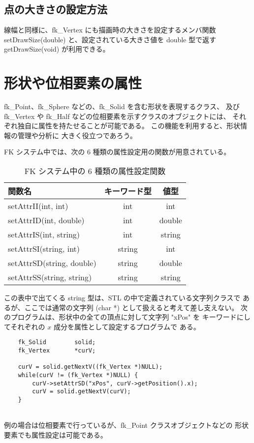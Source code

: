 \subsection{点の大きさの設定方法}
線幅と同様に、fk\_Vertex にも描画時の大きさを設定するメンバ関数
setDrawSize(double) と、設定されている大きさ値を double 型で返す
getDrawSize(void) が利用できる。

\section{形状や位相要素の属性} \label{sec:userattr}
fk\_Point、fk\_Sphere などの、fk\_Solid を含む形状を表現するクラス、
及び fk\_Vertex や fk\_Half などの位相要素を示すクラスのオブジェクトには、
それぞれ独自に属性を持たせることが可能である。
この機能を利用すると、形状情報の管理や分析に
大きく役立つであろう。

FK システム中では、次の 6 種類の属性設定用の関数が用意されている。

\begin{table}[H]
\caption{FK システム中の 6 種類の属性設定関数}
\label{tbl:attr1}
\begin{center}
\begin{tabular}{|l|c|c|}
\hline
関数名 & キーワード型 & 値型 \\ \hline \hline
setAttrII(int, int) & int & int \\ \hline
setAttrID(int, double) & int & double \\ \hline
setAttrIS(int, string) & int & string \\ \hline
setAttrSI(string, int) & string & int \\ \hline
setAttrSD(string, double) & string & double \\ \hline
setAttrSS(string, string) & string & string \\ \hline
\end{tabular}
\end{center}
\end{table}

この表中で出てくる string 型は、STL の中で定義されている文字列クラスで
あるが、ここでは通常の文字列 (char *) として扱えると考えて差し支えない。
次のプログラムは、形状中の全ての頂点に対して文字列 "xPos" を
キーワードにしてそれぞれの \(x\) 成分を属性として設定するプログラムで
ある。
\\
\begin{breakbox}
\begin{verbatim}
    fk_Solid        solid;
    fk_Vertex       *curV;

    curV = solid.getNextV((fk_Vertex *)NULL);
    while(curV != (fk_Vertex *)NULL) {
        curV->setAttrSD("xPos", curV->getPosition().x);
        curV = solid.getNextV(curV);
    }
\end{verbatim}
\end{breakbox}
~ \\
例の場合は位相要素で行っているが、fk\_Point クラスオブジェクトなどの
形状要素でも属性設定は可能である。

